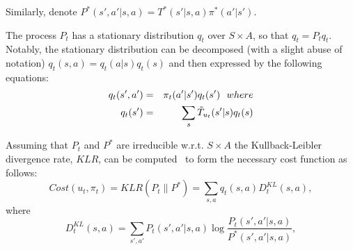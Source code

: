 \documentclass[letterpaper]{aamas2009}
\begin{document}
Similarly, denote $P^*(s',a'|s,a)=T^*(s'|s,a)\pi^*(a'|s')$.

The process $P_t$ has a stationary distribution $q_t$ over $S\times
A$, so that $q_t=P_tq_t$. Notably, the stationary distribution can be
decomposed (with a slight abuse of notation) $q_t(s,a)=q_t(a|s)q_t(s)$
and then expressed by the following equations:
\begin{eqnarray*}
q_t(s',a')&=&\pi_t(a'|s')q_t(s')\ \ \displaystyle{where}\\
q_t(s')&=&\sum\limits_s\Tilde{T}_{u_t}(s'|s)q_t(s)
\end{eqnarray*}

Assuming that $P_t$ and $P^*$ are irreducible w.r.t. $S\times A$ the
Kullback-Leibler divergence rate, $KLR$, can be computed~\cite{rached_alajaji_campbell_2004} to form the
necessary cost function as follows:
$$
Cost(u_t,\pi_t)=KLR(P_t\|P^*)=\sum\limits_{s,a}q_t(s,a)D^{KL}_t(s,a),$$
where $$D^{KL}_t(s,a)=\sum\limits_{s',a'}P_t(s',a'|s,a)\log\frac{P_t(s',a'|s,a)}{P^*(s',a'|s,a)},
$$
\end{document}
